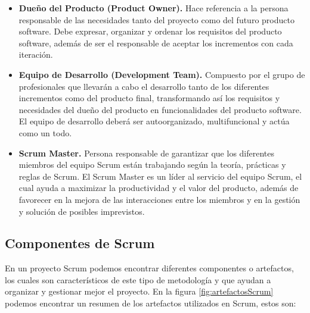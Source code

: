 \begin{itemize}
	\item \textbf{Dueño del Producto (Product Owner).} Hace referencia a la persona responsable de las necesidades tanto del proyecto como del futuro producto software. Debe expresar, organizar y ordenar los requisitos del producto software, además de ser el responsable de aceptar los incrementos con cada iteración.
	\item \textbf{Equipo de Desarrollo (Development Team).} Compuesto por el grupo de profesionales que llevarán a cabo el desarrollo tanto de los diferentes incrementos como del producto final, transformando así los requisitos y necesidades del dueño del producto en funcionalidades del producto software. El equipo de desarrollo deberá ser autoorganizado, multifuncional y actúa como un todo.
	\item \textbf{Scrum Master.} Persona responsable de garantizar que los diferentes miembros del equipo Scrum están trabajando según la teoría, prácticas y reglas de Scrum. El Scrum Master es un líder al servicio del equipo Scrum, el cual ayuda a maximizar la productividad y el valor del producto, además de favorecer en la mejora de las interacciones entre los miembros y en la gestión y solución de posibles imprevistos.
\end{itemize}

\subsection{Componentes de Scrum}
\label{sec:ComponentesScrum}

En un proyecto Scrum podemos encontrar diferentes componentes o artefactos, los cuales son característicos de este tipo de metodología y que ayudan a organizar y gestionar mejor el proyecto. En la figura \ref{fig:artefactosScrum} podemos encontrar un resumen de los artefactos utilizados en Scrum, estos son:


